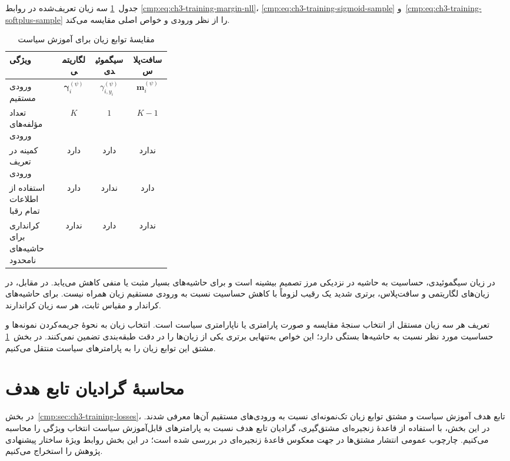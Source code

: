جدول~\ref{cmp:tab:ch3-training-loss-comparison}
سه زیان تعریف‌شده در روابط
\eqref{cmp:eq:ch3-training-margin-nll}،
\eqref{cmp:eq:ch3-training-sigmoid-sample}
و~\eqref{cmp:eq:ch3-training-softplus-sample}
را از نظر ورودی و خواص اصلی مقایسه می‌کند.
\begin{table}[htbp]
\centering
\caption{مقایسهٔ توابع زیان برای آموزش سیاست}
\label{cmp:tab:ch3-training-loss-comparison}
\begin{tabular}{p{0.32\linewidth}ccc}
\hline
ویژگی & لگاریتمی & سیگموئیدی & سافت‌پلاس\\
\hline
ورودی مستقیم
& $\boldsymbol\gamma_i^{(\psi)}$
& $\gamma_{i,y_i}^{(\psi)}$
& $\boldsymbol m_i^{(\psi)}$\\
تعداد مؤلفه‌های ورودی & $K$ & $1$ & $K-1$\\
کمینه در تعریف ورودی & دارد & دارد & ندارد\\
استفاده از اطلاعات تمام رقبا & دارد & ندارد & دارد\\
کرانداری برای حاشیه‌های نامحدود & ندارد & دارد & ندارد\\
\hline
\end{tabular}
\end{table}

در زیان سیگموئیدی، حساسیت به حاشیه در نزدیکی
مرز تصمیم بیشینه است و برای حاشیه‌های بسیار
مثبت یا منفی کاهش می‌یابد. در مقابل، در زیان‌های
لگاریتمی و سافت‌پلاس، برتری شدید یک رقیب لزوماً
با کاهش حساسیت نسبت به ورودی مستقیم زیان همراه نیست.
برای حاشیه‌های کراندار و مقیاس ثابت، هر سه زیان
کراندارند.

تعریف هر سه زیان مستقل از انتخاب سنجهٔ مقایسه
و صورت پارامتری یا ناپارامتری سیاست است.
انتخاب زیان به نحوهٔ جریمه‌کردن نمونه‌ها و
حساسیت مورد نظر نسبت به حاشیه‌ها بستگی دارد؛
این خواص به‌تنهایی برتری یکی از زیان‌ها را در
دقت طبقه‌بندی تضمین نمی‌کنند.
در بخش~\ref{cmp:sec:ch3-gradient-calculation}
مشتق این توابع زیان را به پارامترهای سیاست
منتقل می‌کنیم.

\section{محاسبهٔ گرادیان تابع هدف}
\label{cmp:sec:ch3-gradient-calculation}

در بخش~\ref{cmp:sec:ch3-training-losses}، تابع هدف
آموزش سیاست و مشتق توابع زیان تک‌نمونه‌ای نسبت به
ورودی‌های مستقیم آن‌ها معرفی شدند. در این بخش،
با استفاده از قاعدهٔ زنجیره‌ای مشتق‌گیری، گرادیان
تابع هدف نسبت به پارامترهای قابل‌آموزش سیاست
انتخاب ویژگی را محاسبه می‌کنیم. چارچوب عمومی انتشار مشتق‌ها در جهت معکوس قاعدهٔ زنجیره‌ای در \cite{BaydinEtAl2018AutomaticDifferentiation} بررسی شده است؛ در این بخش روابط ویژهٔ ساختار پیشنهادی پژوهش را استخراج می‌کنیم.

